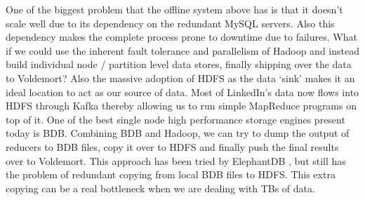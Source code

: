 \documentclass[10pt,twocolumn,preprint,natbib,authoryear]{sigplanconf}
\begin{document}
One of the biggest problem that the offline system above has is that it doesn't scale well due to its dependency on the redundant MySQL servers. Also this dependency makes the complete process prone to downtime due to failures. What if we could use the inherent fault tolerance and parallelism of Hadoop and instead build individual node / partition level data stores, finally shipping over the data to Voldemort? Also the massive adoption of HDFS as the data `sink' makes it an ideal location to act as our source of data. Most of LinkedIn's data now flows into HDFS through Kafka thereby allowing us to run simple MapReduce programs on top of it. One of the best single node high performance storage engines present today is BDB. Combining BDB and Hadoop, we can try to dump the output of reducers to BDB files, copy it over to HDFS and finally push the final results over to Voldemort. This approach has been tried by ElephantDB \cite{ElephantDB}, but still has the problem of redundant copying from local BDB files to HDFS. This extra copying can be a real bottleneck when we are dealing with TBs of data. 
\end{document}
